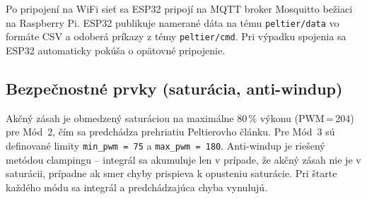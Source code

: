 Po pripojení na WiFi sieť sa ESP32 pripojí na MQTT broker Mosquitto bežiaci na Raspberry Pi. ESP32 publikuje namerané dáta na tému \texttt{peltier/data} vo formáte CSV a odoberá príkazy z témy \texttt{peltier/cmd}. Pri výpadku spojenia sa ESP32 automaticky pokúša o opätovné pripojenie.

\subsection{Bezpečnostné prvky (saturácia, anti-windup)}

Akčný zásah je obmedzený saturáciou na maximálne 80\,\% výkonu (PWM\,=\,204) pre Mód~2, čím sa predchádza prehriatiu Peltierovho článku. Pre Mód~3 sú definované limity \texttt{min\_pwm\,=\,75} a \texttt{max\_pwm\,=\,180}. Anti-windup je riešený metódou clampingu -- integrál sa akumuluje len v prípade, že akčný zásah nie je v saturácii, prípadne ak smer chyby prispieva k opusteniu saturácie. Pri štarte každého módu sa integrál a predchádzajúca chyba vynulujú.